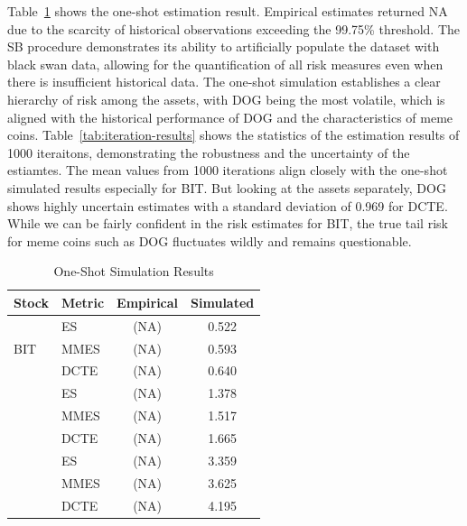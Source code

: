\documentclass[a4paper,11pt]{article}
\begin{document}
Table~\ref{tab:oneshot-results} shows the one-shot estimation result.
Empirical estimates returned NA due to the scarcity of historical observations exceeding the 99.75\% threshold.
The SB procedure demonstrates its ability to artificially populate the dataset with black swan data, allowing for the quantification of all risk measures even when there is insufficient historical data.
The one-shot simulation establishes a clear hierarchy of risk among the assets, with DOG being the most volatile, which is aligned with the historical performance of DOG and the characteristics of meme coins.
Table~\ref{tab:iteration-results} shows the statistics of the estimation results of 1000 iteraitons, demonstrating the robustness and the uncertainty of the estiamtes.
The mean values from 1000 iterations align closely with the one-shot simulated results especially for BIT.
But looking at the assets separately, DOG shows highly uncertain estimates with a standard deviation of 0.969 for DCTE.
While we can be fairly confident in the risk estimates for BIT, the true tail risk for meme coins such as DOG fluctuates wildly and remains questionable.

\begin{table}[htbp]
\centering
\caption{One-Shot Simulation Results}
\label{tab:oneshot-results}
\begin{tabular}{l l c c}
\toprule
Stock & Metric & Empirical & Simulated \\
\midrule
\multirow{3}{*}{BIT} & ES   &    (NA)    & 0.522 \\
                     & MMES &    (NA)    & 0.593 \\
                     & DCTE &    (NA)    & 0.640 \\
\hdashline
\multirow{3}{*}{BNB} & ES   &    (NA)    & 1.378 \\
                     & MMES &    (NA)    & 1.517 \\
                     & DCTE &    (NA)    & 1.665 \\
\hdashline
\multirow{3}{*}{DOG} & ES   &    (NA)    & 3.359 \\
                     & MMES &    (NA)    & 3.625 \\
                     & DCTE &    (NA)    & 4.195 \\
\bottomrule
\end{tabular}
\end{table}
\end{document}
